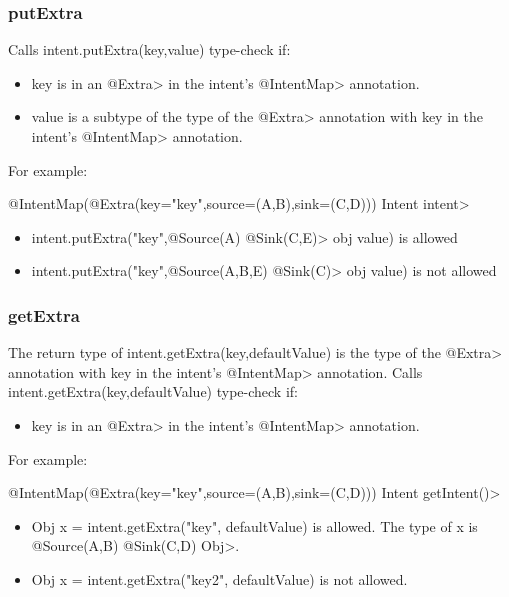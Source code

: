 \subsubsection{putExtra}
Calls intent.putExtra(key,value) type-check if:
\begin{itemize}
\item
 key is in an \<@Extra> in the intent's \<@IntentMap> annotation.
\item
 value is a subtype of the type of the \<@Extra> annotation with key in the
	intent's \<@IntentMap> annotation. 


\end{itemize}
For example:

\<@IntentMap(@Extra(key="key",source=({A,B}),sink=({C,D})))
	Intent intent>
	
\begin{itemize}
\item
intent.putExtra("key",\<@Source({A}) @Sink({C,E})> obj value) is allowed 
\item
intent.putExtra("key",\<@Source({A,B,E}) @Sink({C})> obj value) is not allowed

\end{itemize}

\subsubsection{getExtra}
The return type of intent.getExtra(key,defaultValue) is the type of the \<@Extra>
annotation with key in the intent's \<@IntentMap> annotation.
Calls intent.getExtra(key,defaultValue) type-check if:
\begin{itemize}
\item
key is in an \<@Extra> in the intent's \<@IntentMap> annotation.
\end{itemize}
For example:
		
\<@IntentMap(@Extra(key="key",source=({A,B}),sink=({C,D})))
		Intent getIntent()>
\begin{itemize}
\item
	Obj x = intent.getExtra("key", defaultValue) is allowed. 
	The type of x is \<@Source(A,B) @Sink(C,D) Obj>. 
\item
	Obj x = intent.getExtra("key2", defaultValue) is not allowed.
\end{itemize}

